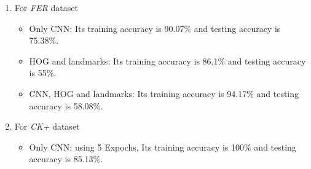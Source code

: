 \begin{enumerate}
	
\item For \textit{FER} dataset \newline
\begin{itemize}[noitemsep,nolistsep]
    \item Only CNN: Its training accuracy is 90.07\% and testing accuracy is 75.38\%.

	\begin{comment}
    \item Only HOG: 
        \begin{itemize}
            \item It takes X time in training and X time in testing.
            \item The model size was 966 KB.
            \item Its training accuracy is 72.33\% and testing accuracy is 53.9\%.
        \end{itemize}
    \item Only landmarks: 
        \begin{itemize}
            \item It takes X time in training and X time in testing.
            \item The model size was X.
            \item Its training accuracy is X and testing accuracy is X.
        \end{itemize}
	\end{comment}

    \item HOG and landmarks: Its training accuracy is 86.1\% and testing accuracy is 55\%.
    \item CNN, HOG and landmarks: Its training accuracy is 94.17\% and testing accuracy is 58.08\%.
\end{itemize}

\item For \textit{CK+} dataset \newline
\begin{itemize}[noitemsep,nolistsep]
    \item Only CNN: using 5 Expochs, Its training accuracy is 100\% and testing accuracy is 85.13\%.


\end{itemize}
\end{enumerate}
